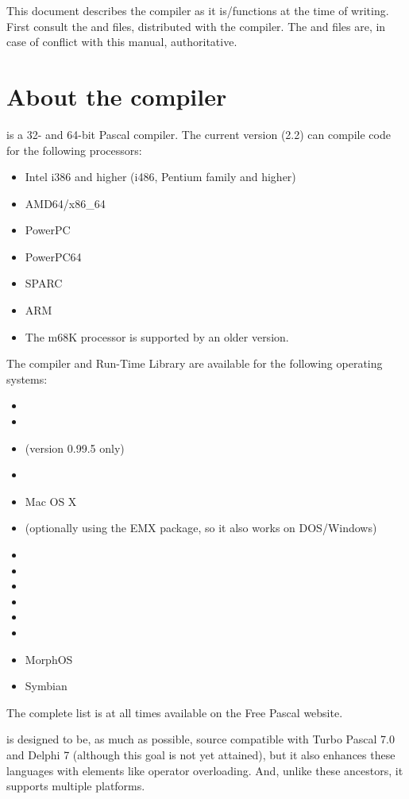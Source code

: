 This document describes the compiler as it is/functions at the time of
writing. First consult the  and  files, distributed 
with the compiler. The  and  files are, in case of 
conflict with this manual, authoritative.

\section{About the compiler}
\fpc is a 32- and 64-bit Pascal compiler. The current version (2.2)
can compile code for the following processors:
\begin{itemize}
\item Intel i386 and higher (i486, Pentium family and higher)
\item AMD64/x86\_64
\item PowerPC
\item PowerPC64
\item SPARC
\item ARM
\item The m68K processor is supported by an older version.
\end{itemize}
The compiler and Run-Time Library are available for the following operating systems:
\begin{itemize}
\item \dos
\item \linux %
\item \amiga (version 0.99.5 only)
\item \windows
\item Mac OS X 
\item \ostwo (optionally using the EMX package, so it also works on DOS/Windows)
\item \freebsd
\item \beos 
\item \solaris
\item \netbsd 
\item \netware
\item \openbsd 
\item MorphOS
\item Symbian
\end{itemize}
The complete list is at all times available on the Free Pascal website.

\fpc is designed to be, as much as possible, source compatible with
Turbo Pascal 7.0 and Delphi 7 (although this goal is not yet attained),
but it also enhances these languages with elements like operator overloading.
And, unlike these ancestors, it supports multiple platforms.

